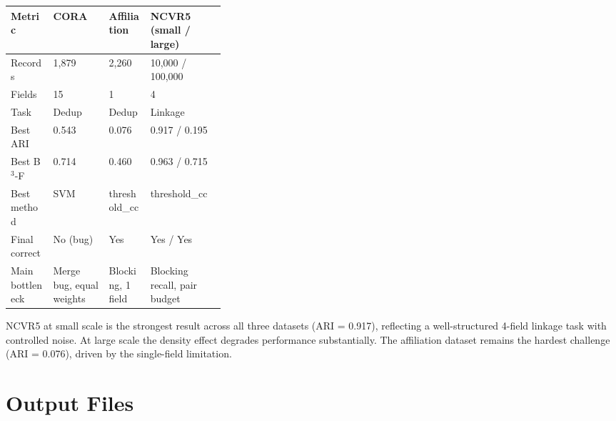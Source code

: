 \documentclass[11pt, a4paper]{article}
\begin{document}
\begin{table}[h!]
\centering
\begin{tabular}{lllp{0.35\linewidth}}
\toprule
\textbf{Metric} & \textbf{CORA} & \textbf{Affiliation} & \textbf{NCVR5 (small / large)} \\
\midrule
Records        & 1,879  & 2,260  & 10,000 / 100,000 \\
Fields         & 15     & 1      & 4 \\
Task           & Dedup  & Dedup  & Linkage \\
Best ARI       & 0.543  & 0.076  & 0.917 / 0.195 \\
Best B$^3$-F   & 0.714  & 0.460  & 0.963 / 0.715 \\
Best method    & SVM    & threshold\_cc & threshold\_cc \\
Final correct  & No (bug) & Yes  & Yes / Yes \\
Main bottleneck & Merge bug, equal weights & Blocking, 1 field & Blocking recall, pair budget \\
\bottomrule
\end{tabular}
\end{table}

NCVR5 at small scale is the strongest result across all three datasets
(ARI = 0.917), reflecting a well-structured 4-field linkage task with controlled
noise. At large scale the density effect degrades performance substantially.
The affiliation dataset remains the hardest challenge (ARI = 0.076), driven
by the single-field limitation.

\section{Output Files}
\end{document}
